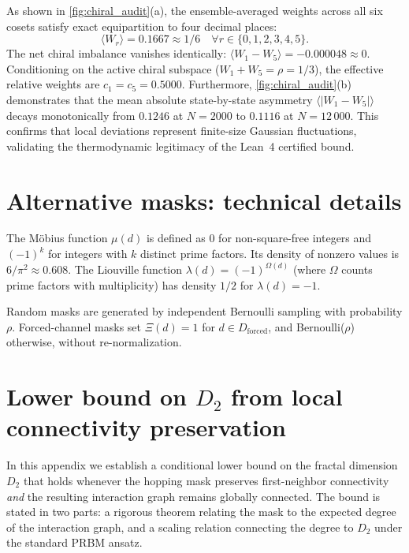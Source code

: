\documentclass[11pt,a4paper]{article}
\begin{document}
As shown in \cref{fig:chiral_audit}(a), the ensemble-averaged weights across all six cosets satisfy exact equipartition to four decimal places:
\begin{equation}
\langle W_r \rangle = 0.1667 \approx 1/6 \quad \forall r \in \{0, 1, 2, 3, 4, 5\}.
\end{equation}
The net chiral imbalance vanishes identically: $\langle W_1 - W_5 \rangle = -0.000048 \approx 0$. Conditioning on the active chiral subspace ($W_1 + W_5 = \rho = 1/3$), the effective relative weights are $c_1 = c_5 = 0.5000$. Furthermore, \cref{fig:chiral_audit}(b) demonstrates that the mean absolute state-by-state asymmetry $\langle |W_1 - W_5| \rangle$ decays monotonically from $0.1246$ at $N = 2000$ to $0.1116$ at $N = 12\,000$. This confirms that local deviations represent finite-size Gaussian fluctuations, validating the thermodynamic legitimacy of the Lean~4 certified bound.

\section{Alternative masks: technical details}
\label{app:altmasks}

The Möbius function $\mu(d)$ is defined as $0$ for non-square-free integers and $(-1)^k$ for integers with $k$ distinct prime factors. Its density of nonzero values is $6/\pi^2 \approx 0.608$. The Liouville function $\lambda(d) = (-1)^{\Omega(d)}$ (where $\Omega$ counts prime factors with multiplicity) has density $1/2$ for $\lambda(d) = -1$.

Random masks are generated by independent Bernoulli sampling with probability $\rho$. Forced-channel masks set $\Xi(d) = 1$ for $d \in D_{\text{forced}}$, and Bernoulli($\rho$) otherwise, without re-normalization.

\section{Lower bound on \texorpdfstring{$D_2$}{D2} from local connectivity preservation}
\label{app:lower_bound}

In this appendix we establish a conditional lower bound on the fractal dimension $D_2$ that holds whenever the hopping mask preserves first-neighbor connectivity \emph{and} the resulting interaction graph remains globally connected. The bound is stated in two parts: a rigorous theorem relating the mask to the expected degree of the interaction graph, and a scaling relation connecting the degree to $D_2$ under the standard PRBM ansatz.
\end{document}

